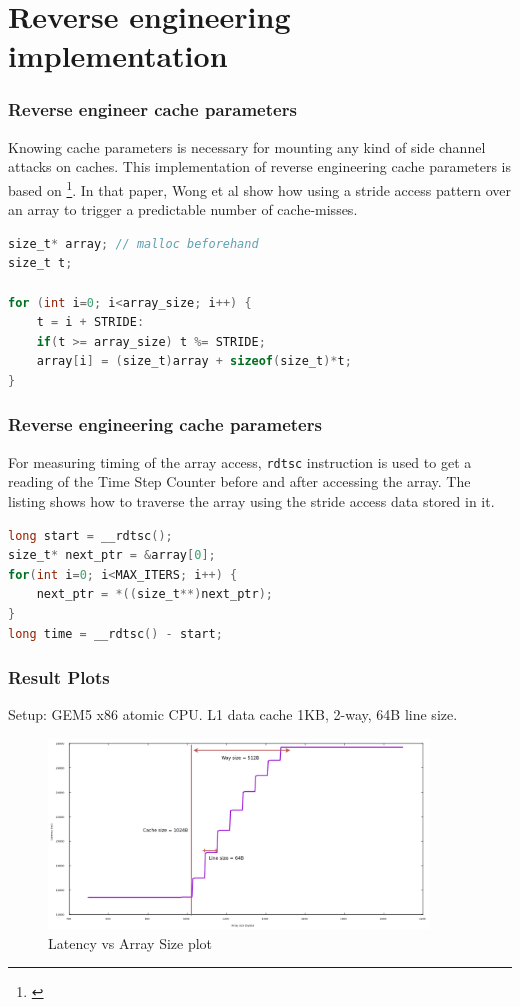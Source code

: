 \documentclass[10pt]{beamer}
\begin{document}
\section{Reverse engineering implementation}
\begin{frame}[fragile]
\frametitle{Reverse engineer cache parameters}
    Knowing cache parameters is necessary for mounting any kind of side channel attacks on caches.
    This implementation of reverse engineering cache parameters is based on \footnote{\cite{wong}}. In that
    paper, Wong et al show how using a stride access pattern over an array to trigger a predictable number of cache-misses.

\begin{lstlisting}[caption={Generate array of given size with fixed stride pattern},language={C}]
size_t* array; // malloc beforehand
size_t t;

for (int i=0; i<array_size; i++) {
    t = i + STRIDE:
    if(t >= array_size) t %= STRIDE;
    array[i] = (size_t)array + sizeof(size_t)*t;
}
\end{lstlisting}

\end{frame}


\begin{frame}[fragile]
\frametitle{Reverse engineering cache parameters}
For measuring timing of the array access, \texttt{rdtsc} instruction is used to get a reading of the Time Step Counter before
and after accessing the array. The listing shows how to traverse the array
using the stride access data stored in it.
\begin{lstlisting}[caption={Timing measurement of stride access over the entire array},language={C}]
long start = __rdtsc();
size_t* next_ptr = &array[0];
for(int i=0; i<MAX_ITERS; i++) {
    next_ptr = *((size_t**)next_ptr);
}
long time = __rdtsc() - start;
\end{lstlisting}
\end{frame}

\begin{frame}
\frametitle{Result Plots}
Setup: GEM5 x86 atomic CPU. L1 data cache 1KB, 2-way, 64B line size.
\begin{figure}
\includegraphics[width=0.9\textwidth]{reverse_eng_1kb}
\caption{Latency vs Array Size plot}
\end{figure}
\end{frame}
\end{document}
